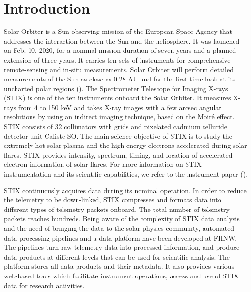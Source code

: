 \documentclass[referee]{aa} %
\begin{document}
   \maketitle


\section{Introduction}
Solar Orbiter is a Sun-observing mission of the European Space Agency that 
addresses the interaction between the Sun and the heliosphere.
It was launched on Feb. 10, 2020, for a nominal mission duration of seven years and a planned 
extension of three years. It carries ten sets of instruments for comprehensive
remote-sensing and in-situ measurements. 
Solar Orbiter will perform detailed measurements of the Sun as close as 0.28 AU and for the first time look at its uncharted polar regions (\cite{SolarOrbiter2020}).  
The Spectrometer Telescope for Imaging X-rays (STIX) is one of the ten instruments onboard the Solar Orbiter.  
It measures X-rays from 4 to 150 keV and takes X-ray images with a few arcsec angular resolutions by using an indirect imaging technique,
based on the Moiré effect.  STIX consists of 32 collimators with grids and pixelated cadmium telluride detector unit Caliste-SO. 
The main science objective of STIX is to study the extremely hot solar plasma and the high-energy electrons accelerated during solar flares. STIX provides intensity,  spectrum, timing, and location of accelerated electron information of solar flares.
For more information on STIX instrumentation and its scientific capabilities, we refer to the instrument paper (\cite{StixInstrument}).


STIX continuously acquires data during its nominal operation. 
In order to reduce the telemetry to be down-linked, STIX compresses and formats data into different types of telemetry packets onboard.
 The total number of telemetry packets reaches hundreds. 
Being aware of the complexity of STIX data analysis and the need of bringing the data to the 
solar physics community, automated data processing pipelines and a data platform have been developed at FHNW. 
The pipelines turn raw telemetry data into processed information,  and produce data products at different levels
 that can be used for scientific analysis.
 The platform stores all data products and their metadata. 
 It also provides various web-based tools which facilitate instrument operations,
  access and use of STIX data for research activities.
\end{document}
